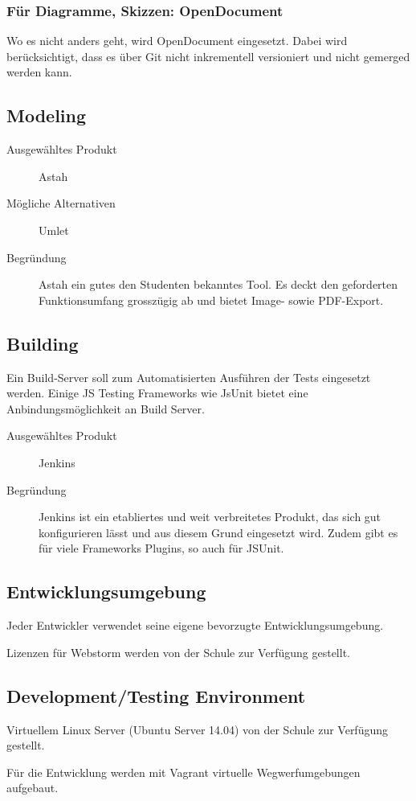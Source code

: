 			\subsubsection{Für Diagramme, Skizzen: OpenDocument}
				Wo es nicht anders geht, wird OpenDocument eingesetzt. Dabei wird
				berücksichtigt, dass es über Git nicht inkrementell versioniert und nicht
				gemerged werden kann.


		\subsection{Modeling}
			\begin{description}
				\item[Ausgewähltes Produkt] Astah
				\item[Mögliche Alternativen] Umlet
				\item[Begründung] Astah ein gutes den Studenten bekanntes Tool.
					Es deckt den geforderten Funktionsumfang grosszügig ab und bietet Image- sowie PDF-Export.
			\end{description}
			



		\subsection{Building}
			Ein Build-Server soll zum Automatisierten Ausführen der Tests eingesetzt werden.
			Einige JS Testing Frameworks wie JsUnit bietet eine Anbindungsmöglichkeit an Build Server.
			
			\begin{description}
				\item[Ausgewähltes Produkt] Jenkins
				\item[Begründung]  Jenkins ist ein etabliertes und weit verbreitetes Produkt, 
					das sich gut konfigurieren lässt und aus diesem Grund eingesetzt wird.
					Zudem gibt es für viele Frameworks Plugins, so auch für JSUnit.
			\end{description}


		\subsection{Entwicklungsumgebung}
			Jeder Entwickler verwendet seine eigene bevorzugte Entwicklungsumgebung. 
			
			Lizenzen für Webstorm werden von der Schule zur Verfügung gestellt.


		\subsection{Development/Testing Environment}
			Virtuellem Linux Server (Ubuntu Server 14.04) von der Schule zur Verfügung gestellt.
			
			Für die Entwicklung werden mit Vagrant virtuelle Wegwerfumgebungen aufgebaut.
